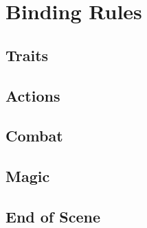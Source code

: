\documentclass[a4paper,openany]{book}
\date{\today}
\begin{document}
\frontmatter

\section*{Binding Rules}

\begin{multicols}{2}

\subsection*{Traits}











\subsection*{Actions}






\subsection*{Combat}





\subsection*{Magic}



\subsection*{End of Scene}



\end{multicols}
\end{document}
